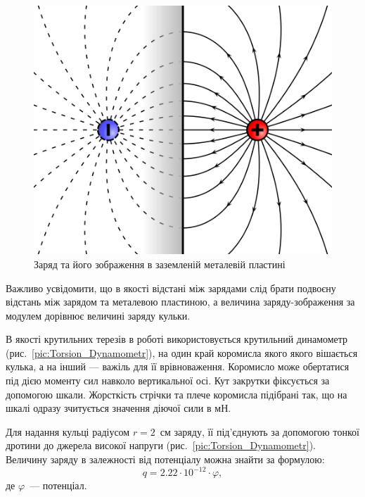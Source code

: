 \documentclass{LabWork}
\begin{document}
\begin{figure}\centering
		\includegraphics[width=1\linewidth]{ChargeImage}
		\caption{Заряд та його зображення в заземленій металевій пластині}
		\label{pic:Charge_Image}
\end{figure}
Важливо усвідомити, що в якості відстані між зарядами слід брати подвоєну відстань між зарядом та металевою пластиною, а величина заряду-зображення за модулем дорівнює величині заряду кульки.

В якості крутильних терезів в роботі використовується крутильний динамометр (рис.~\ref{pic:Torsion_Dynamometr}), на один край коромисла якого якого вішається кулька, а на інший --- важіль для її врівноваження. Коромисло може обертатися під дією моменту сил навколо вертикальної осі. Кут закрутки фіксується за допомогою шкали. Жорсткість стрічки та плече коромисла підібрані так, що на шкалі одразу зчитується значення діючої сили в мН.

Для надання кульці радіусом $r = 2$~см заряду, її під'єднують за допомогою тонкої дротини до джерела високої напруги (рис.~\ref{pic:Torsion_Dynamometr}). Величину заряду в залежності від потенціалу можна знайти за формулою:
\begin{equation}\label{qU}
    q = 2.22 \cdot 10^{-12} \cdot \varphi,
\end{equation}
де $\varphi$~--- потенціал.
\end{document}
